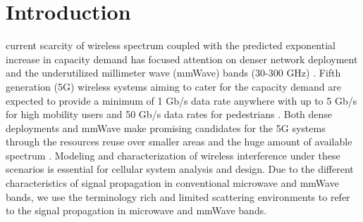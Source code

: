\documentclass[12pt, draftclsnofoot, onecolumn]{IEEEtran}
\theoremstyle{plain}
\begin{document}
\IEEEpeerreviewmaketitle

\vspace{-.17in}
\section{Introduction}\label{intro}\vspace{-.1in}
 current scarcity of wireless spectrum coupled with the predicted exponential increase in capacity demand has focused attention on denser network deployment and the underutilized {millimeter wave (mmWave)} bands (30-300 GHz) \cite{6398884,mmWaveEnable,ref_2e}. %
 Fifth generation (5G) wireless systems aiming to cater for the capacity demand are expected to provide a minimum of 1 Gb/s data rate anywhere with up to 5 Gb/s for high mobility users and 50 Gb/s data rates for pedestrians \cite{mmWaveEnable}. 
%
% 
 Both dense deployments and mmWave make promising candidates for the 5G systems through the resources reuse over smaller areas and the huge amount of available spectrum \cite{Baimm14,mmWaveEnable}.  Modeling and characterization of wireless interference under these scenarios is essential for cellular system analysis and design. Due to the different characteristics of signal propagation in conventional microwave and mmWave bands, we use the terminology rich and limited scattering environments to refer to the signal propagation in microwave and mmWave bands.

\vspace{-.15in}
\end{document}
